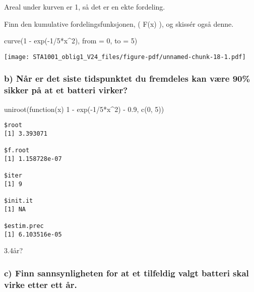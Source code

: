 \documentclass[
  12pt,
  a4paper,
  DIV=11,
  numbers=noendperiod]{scrartcl}
\newenvironment{Shaded}{\begin{snugshade}}{\end{snugshade}}
\newcommand{\AttributeTok}[1]{\textcolor[rgb]{0.40,0.45,0.13}{#1}}
\newcommand{\ControlFlowTok}[1]{\textcolor[rgb]{0.00,0.23,0.31}{#1}}
\newcommand{\DecValTok}[1]{\textcolor[rgb]{0.68,0.00,0.00}{#1}}
\newcommand{\FloatTok}[1]{\textcolor[rgb]{0.68,0.00,0.00}{#1}}
\newcommand{\FunctionTok}[1]{\textcolor[rgb]{0.28,0.35,0.67}{#1}}
\newcommand{\NormalTok}[1]{\textcolor[rgb]{0.00,0.23,0.31}{#1}}
\newcommand{\SpecialCharTok}[1]{\textcolor[rgb]{0.37,0.37,0.37}{#1}}
\begin{document}
Areal under kurven er 1, så det er en ekte fordeling.

Finn den kumulative fordelingsfunksjonen, ( F(x) ), og skissér også
denne.

\begin{Shaded}
\begin{Highlighting}[]
\FunctionTok{curve}\NormalTok{(}\DecValTok{1} \SpecialCharTok{{-}} \FunctionTok{exp}\NormalTok{(}\SpecialCharTok{{-}}\DecValTok{1}\SpecialCharTok{/}\DecValTok{5}\SpecialCharTok{*}\NormalTok{x}\SpecialCharTok{\^{}}\DecValTok{2}\NormalTok{), }\AttributeTok{from =} \DecValTok{0}\NormalTok{, }\AttributeTok{to =} \DecValTok{5}\NormalTok{)}
\end{Highlighting}
\end{Shaded}

\texttt{[image: STA1001\_oblig1\_V24\_files/figure-pdf/unnamed-chunk-18-1.pdf]}

\subsubsection{b) Når er det siste tidspunktet du fremdeles kan være
90\% sikker på at et batteri
virker?}\label{b-nuxe5r-er-det-siste-tidspunktet-du-fremdeles-kan-vuxe6re-90-sikker-puxe5-at-et-batteri-virker}

\begin{Shaded}
\begin{Highlighting}[]
\FunctionTok{uniroot}\NormalTok{(}\ControlFlowTok{function}\NormalTok{(x) }\DecValTok{1} \SpecialCharTok{{-}} \FunctionTok{exp}\NormalTok{(}\SpecialCharTok{{-}}\DecValTok{1}\SpecialCharTok{/}\DecValTok{5}\SpecialCharTok{*}\NormalTok{x}\SpecialCharTok{\^{}}\DecValTok{2}\NormalTok{) }\SpecialCharTok{{-}} \FloatTok{0.9}\NormalTok{, }\FunctionTok{c}\NormalTok{(}\DecValTok{0}\NormalTok{, }\DecValTok{5}\NormalTok{))}
\end{Highlighting}
\end{Shaded}

\begin{verbatim}
$root
[1] 3.393071

$f.root
[1] 1.158728e-07

$iter
[1] 9

$init.it
[1] NA

$estim.prec
[1] 6.103516e-05
\end{verbatim}

3.4år?

\subsubsection{c) Finn sannsynligheten for at et tilfeldig valgt batteri
skal virke etter ett
år.}\label{c-finn-sannsynligheten-for-at-et-tilfeldig-valgt-batteri-skal-virke-etter-ett-uxe5r.}
\end{document}
